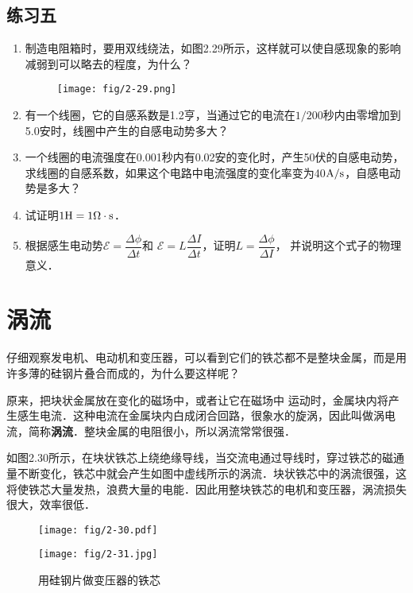 \subsection*{练习五}
\begin{enumerate}
    \item 制造电阻箱时，要用双线绕法，如图2.29所示，这样就可以使自感现象的影响减弱到可以略去的程度，为什么？
    \begin{figure}[htp]\centering
\texttt{[image: fig/2-29.png]}
\caption{}
\end{figure}

    \item 有一个线圈，它的自感系数是1.2亨，当通过它的电流在$1/200$秒内由零增加到5.0安时，线圈中产生的自感电动势多大？
    \item 一个线圈的电流强度在0.001秒内有0.02安的变化时，产生50伏的自感电动势，求线圈的自感系数，如果这个电路中电流强度的变化率变为40${\rm A}/{\rm s}$，自感电动势是多大？
    \item 试证明$1{\rm H}=1\Omega\cdot {\rm s}$．
    \item 根据感生电动势$\mathcal{E}=\dfrac{\Delta \phi}{\Delta t}$和 $\mathcal{E}=L\dfrac{\Delta I}{\Delta t}$，证明$L=\dfrac{\Delta \phi}{\Delta I}$，
    并说明这个式子的物理意义．
\end{enumerate}

\section{涡流}

仔细观察发电机、电动机和变压器，可以看到它们的铁芯都不是整块金属，而是用许多薄的硅钢片叠合而成的，为什么要这样呢？

原来，把块状金属放在变化的磁场中，或者让它在磁场中
运动时，金属块内将产生感生电流．这种电流在金属块内白成闭合回路，很象水的旋涡，因此叫做涡电流，简称\textbf{涡流}．整块金属的电阻很小，所以涡流常常很强．

如图2.30所示，在块状铁芯上绕绝缘导线，当交流电通过导线时，穿过铁芯的磁通量不断变化，铁芯中就会产生如图中虚线所示的涡流．块状铁芯中的涡流很强，这将使铁芯大量发热，浪费大量的电能．因此用整块铁芯的电机和变压器，涡流损失很大，效率很低．

\begin{figure}[htp]\centering
	\begin{minipage}[t]{0.48\textwidth}
		\centering
    \texttt{[image: fig/2-30.pdf]}
		\caption{}
	\end{minipage}
	\begin{minipage}[t]{0.48\textwidth}
		\centering
    \texttt{[image: fig/2-31.jpg]}
\caption{用硅钢片做变压器的铁芯}
	\end{minipage}
\end{figure}


